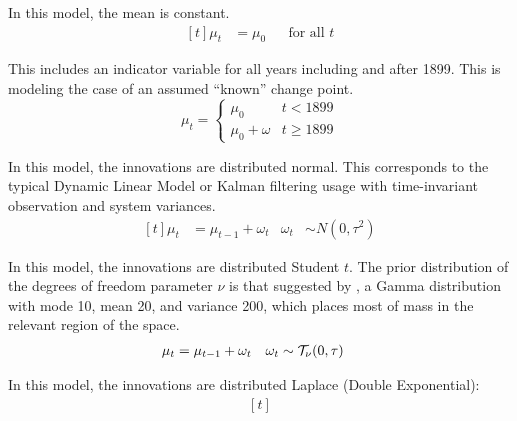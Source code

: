 \begin{description}[font = \normalfont\ModelII]
\item[Constant mean] In this model, the mean is constant.
  \begin{equation}
    \label{dlm:eq:21}
    \begin{aligned}[t]
      \mu_{t} &= \mu_{0} && \text{for all $t$}
    \end{aligned}
  \end{equation}
\item[Manual intervention] This includes an indicator variable for all years including and after 1899.
  This is modeling the case of an assumed ``known'' change point.
  \begin{equation}
    \mu_{t} = 
    \begin{cases}
      \mu_{0} & t < 1899 \\
      \mu_{0} + \omega & t \geq 1899
    \end{cases}
  \end{equation}
\item[Normal distribution] In this model, the innovations are distributed normal.
  This corresponds to the typical Dynamic Linear Model or Kalman filtering usage with time-invariant observation and system variances.
  \begin{equation}
    \label{dlm:eq:11}
    \begin{aligned}[t]
      \mu_{t} &= \mu_{t - 1} + \omega_{t} & \omega_{t} & \sim N(0, \tau^{2})
    \end{aligned}
  \end{equation}
\item[StudentT] In this model, the innovations are distributed Student $t$.
  The prior distribution of the degrees of freedom parameter $\nu$ is that suggested by \textcites{JuarezSteel2010b}, a Gamma distribution with mode 10, mean 20, and variance 200, which places most of mass in the relevant region of the space.
  \begin{equation}
    \label{dlm:eq:18}
    \begin{aligned}[t]
      \mu_{t} &= \mu_{t - 1} + \omega_{t} & \omega_{t} & \sim \mathcal{T}_{\nu}\mathopen{}\left(0, \tau\right)\mathclose{}
    \end{aligned}
  \end{equation}
\item[Laplace] In this model, the innovations are distributed Laplace (Double Exponential):
  \begin{equation}
    \label{dlm:eq:22}
    \begin{aligned}[t]

\end{aligned}
\end{equation}
\end{description}

